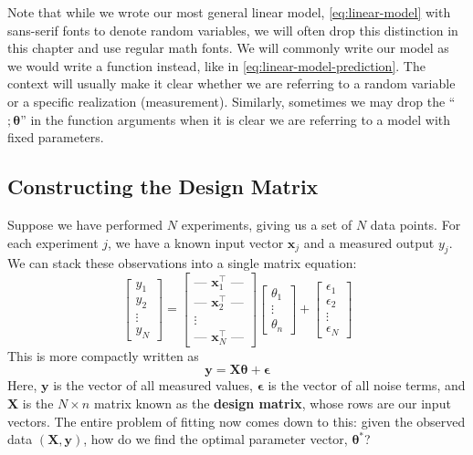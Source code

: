 \begin{warningBox}
Note that while we wrote our most general linear model, \autoref{eq:linear-model} with sans-serif fonts to denote random variables, we will often drop this distinction in this chapter and use regular math fonts. We will commonly write our model as we would write a function instead, like in \autoref{eq:linear-model-prediction}. The context will usually make it clear whether we are referring to a random variable or a specific realization (measurement). Similarly, sometimes we may drop the ``$; \bm{\theta}$'' in the function arguments when it is clear we are referring to a model with fixed parameters.
\end{warningBox}

\subsection{Constructing the Design Matrix} Suppose we have performed $N$ experiments, giving us a set of $N$ data points. For each experiment $j$, we have a known input vector $\mathbf{x}_j$ and a measured output $y_j$. We can stack these observations into a single matrix equation:
\begin{equation}
    \begin{bmatrix}
        y_1 \\
        y_2 \\
        \vdots \\
        y_N
    \end{bmatrix}
    =
    \begin{bmatrix}
        \text{--- } \mathbf{x}_1^\top \text{ ---} \\
        \text{--- } \mathbf{x}_2^\top \text{ ---} \\
        \vdots \\
        \text{--- } \mathbf{x}_N^\top \text{ ---}
    \end{bmatrix}
    \begin{bmatrix}
        \theta_1 \\
        \vdots \\
        \theta_n
    \end{bmatrix}
    +
    \begin{bmatrix}
        \epsilon_1 \\
        \epsilon_2 \\
        \vdots \\
        \epsilon_N
    \end{bmatrix}
\end{equation}
This is more compactly written as
\begin{equation}
    \mathbf{y} = \mathbf{X}\boldsymbol{\theta} + \boldsymbol{\epsilon}
\end{equation}
Here, $\mathbf{y}$ is the vector of all measured values, $\boldsymbol{\epsilon}$ is the vector of all noise terms, and $\mathbf{X}$ is the $N \times n$ matrix known as the \textbf{design matrix}, whose rows are our input vectors. The entire problem of fitting now comes down to this: given the observed data $(\mathbf{X}, \mathbf{y})$, how do we find the optimal parameter vector, $\boldsymbol{\theta}^*$?

